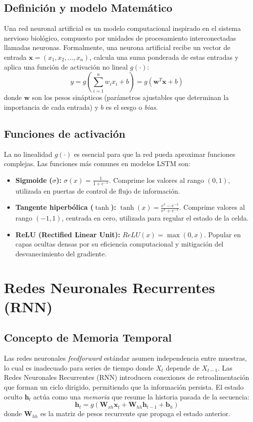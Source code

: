 \subsection{Definición y modelo Matemático}
Una red neuronal artificial es un modelo computacional inspirado en el sistema nervioso biológico, compuesto por unidades de procesamiento interconectadas llamadas neuronas. Formalmente, una neurona artificial recibe un vector de entrada \(\mathbf{x} = (x_1, x_2, ..., x_n)\), calcula una suma ponderada de estas entradas y aplica una función de activación no lineal \(g(\cdot)\):
\begin{equation}
    y = g\left( \sum_{i=1}^{n} w_i x_i + b \right) = g(\mathbf{w}^T \mathbf{x} + b)
\end{equation}
donde \(\mathbf{w}\) son los pesos sinápticos (parámetros ajustables que determinan la importancia de cada entrada) y \(b\) es el sesgo o \textit{bias}.

\subsection{Funciones de activación}
La no linealidad \(g(\cdot)\) es esencial para que la red pueda aproximar funciones complejas. Las funciones más comunes en modelos LSTM son:
\begin{itemize}
    \item \textbf{Sigmoide (\(\sigma\)):} \(\sigma(x) = \frac{1}{1+e^{-x}}\). Comprime los valores al rango \((0, 1)\), utilizada en puertas de control de flujo de información.
    \item \textbf{Tangente hiperbólica (\(\tanh\)):} \(\tanh(x) = \frac{e^x - e^{-x}}{e^x + e^{-x}}\). Comprime valores al rango \((-1, 1)\), centrada en cero, utilizada para regular el estado de la celda.
    \item \textbf{ReLU (Rectified Linear Unit):} \(ReLU(x) = \max(0, x)\). Popular en capas ocultas densas por su eficiencia computacional y mitigación del desvanecimiento del gradiente.
\end{itemize}

\section{Redes Neuronales Recurrentes (RNN)}

\subsection{Concepto de Memoria Temporal}
Las redes neuronales \textit{feedforward} estándar asumen independencia entre muestras, lo cual es inadecuado para series de tiempo donde \(X_t\) depende de \(X_{t-1}\). Las Redes Neuronales Recurrentes (RNN) introducen conexiones de retroalimentación que forman un ciclo dirigido, permitiendo que la información persista. El estado oculto \(\mathbf{h}_t\) actúa como una \textit{memoria} que resume la historia pasada de la secuencia:
\begin{equation}
    \mathbf{h}_t = g(\mathbf{W}_{xh} \mathbf{x}_t + \mathbf{W}_{hh} \mathbf{h}_{t-1} + \mathbf{b}_h)
\end{equation}
donde \(\mathbf{W}_{hh}\) es la matriz de pesos recurrente que propaga el estado anterior.


